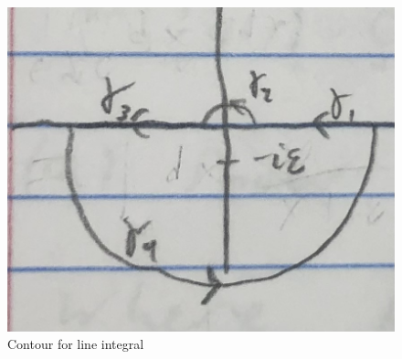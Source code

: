 \documentclass[12pt]{amsart}
\begin{document}
\begin{enumerate}
\begin{figure}[h!]
    \centering
    \includegraphics[scale=.2]{Images/contours}
    \caption{Contour for line integral}
    \label{fig:fig1}
\end{figure}


\hdashrule[0.5ex][c]{\linewidth}{0.5pt}{1.5mm}



\end{enumerate}
\end{document}
